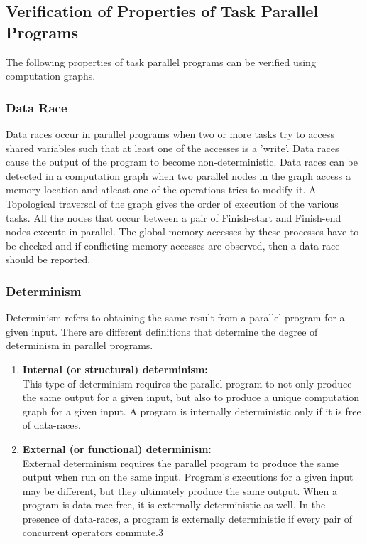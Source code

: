 \subsection{Verification of Properties of Task Parallel Programs}
The following properties of task parallel programs can be verified using computation graphs.
\subsubsection{Data Race}
Data races occur in parallel programs when two or more tasks try to access shared variables such that at least one of the accesses is a 'write'. Data races cause the output of the program to become non-deterministic. Data races can be detected in a computation graph when two parallel nodes in the graph access a memory location and atleast one of the operations tries to modify it. A Topological traversal of the graph gives the order of execution of the various tasks. All the nodes that occur between  a pair of Finish-start and Finish-end nodes execute in parallel. The global memory accesses by these processes have to be checked and if conflicting memory-accesses are observed, then a data race should be reported.
\subsubsection{Determinism}
Determinism refers to obtaining the same result from a parallel program for a given input. There are different definitions that determine the degree of determinism in parallel programs.
\begin{enumerate}
\item
\textbf{Internal (or structural) determinism:\\}
This type of determinism requires the parallel program to not only produce the same output for a given input, but also to produce a unique computation graph for a given input. A program is internally deterministic only if it is free of data-races.
\item
\textbf{External (or functional) determinism:\\}
External determinism requires the parallel program to produce the same output when run on the same input. Program's executions for a given input may be different, but they ultimately produce the same output. When a program is data-race free, it is externally deterministic as well. In the presence of data-races, a program is externally deterministic if every pair of concurrent operators commute.3
\end{enumerate}
